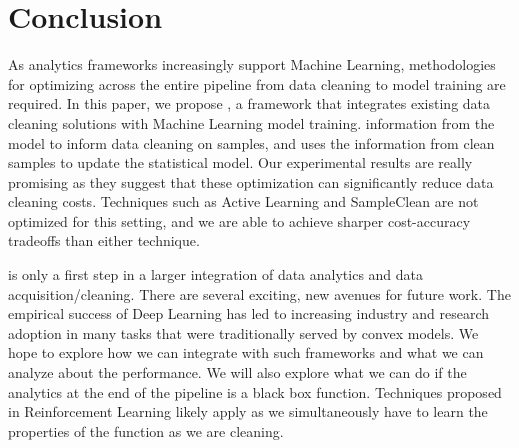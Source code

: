 \vspace{-1.0em}
\section{Conclusion}
As analytics frameworks increasingly support Machine Learning, methodologies for optimizing across the entire pipeline from data cleaning to model training are required.
In this paper, we propose \sysfull, a framework that integrates existing data cleaning solutions with Machine Learning model training.
\sys information from the model to inform data cleaning on samples, and uses the information from clean samples to update the statistical model.
Our experimental results are really promising as they suggest that these optimization can significantly reduce data cleaning costs.
Techniques such as Active Learning and SampleClean are not optimized for this setting, and we are able to achieve sharper cost-accuracy tradeoffs than either technique.

\sys is only a first step in a larger integration of data analytics and data acquisition/cleaning. 
There are several exciting, new avenues for future work.
The empirical success of Deep Learning has led to increasing industry and research adoption in many tasks that were traditionally served by convex models.
We hope to explore how we can integrate with such frameworks and what we can analyze about the performance.
We will also explore what we can do if the analytics at the end of the pipeline is a black box function.
Techniques proposed in Reinforcement Learning likely apply as we simultaneously have to learn the properties of the function as we are cleaning.